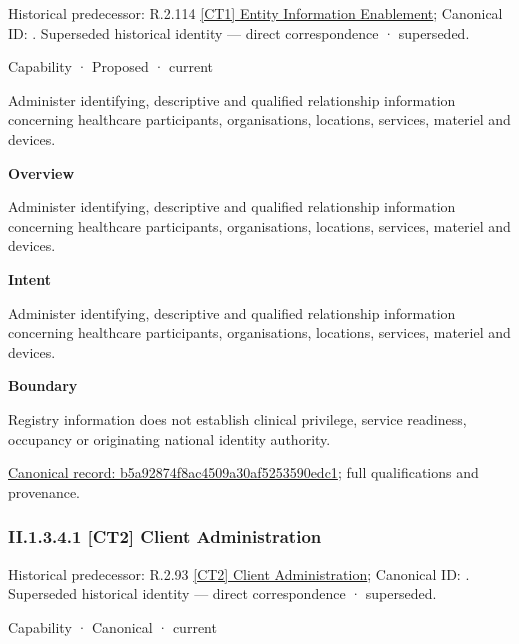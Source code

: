 {\small Historical predecessor: R.2.114 \hyperref[element:e4d959d6c71d498c9ce00d2be4c048e3]{[CT1] Entity Information Enablement}; Canonical ID: \texttt{}. Superseded historical identity — direct correspondence · superseded.}\par
\label{element:b5a92874f8ac4509a30af5253590edc1}
{\small Capability · Proposed · current}\par

Administer identifying, descriptive and qualified relationship information concerning healthcare participants, organisations, locations, services, materiel and devices.



\textbf{Overview}



Administer identifying, descriptive and qualified relationship information concerning healthcare participants, organisations, locations, services, materiel and devices.



\textbf{Intent}



Administer identifying, descriptive and qualified relationship information concerning healthcare participants, organisations, locations, services, materiel and devices.



\textbf{Boundary}



Registry information does not establish clinical privilege, service readiness, occupancy or originating national identity authority.


{\footnotesize \href{../../../../../../../continuum/strategy/capability/b5a92874f8ac4509a30af5253590edc1.md}{Canonical record: b5a92874f8ac4509a30af5253590edc1}; full qualifications and provenance.}\par
\subsubsection*{II.1.3.4.1 [CT2] Client Administration}
\label{navigation:II.1.3.4.1}

{\small Historical predecessor: R.2.93 \hyperref[element:70d2a44a0442441f8b306b82b297bb8a]{[CT2] Client Administration}; Canonical ID: \texttt{}. Superseded historical identity — direct correspondence · superseded.}\par
\label{element:f0885472cced4bccbcce1568bf0360dc}
{\small Capability · Canonical · current}\par

